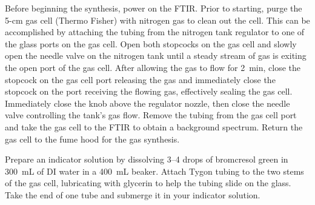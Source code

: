 Before beginning the synthesis, power on the FTIR. 
Prior to starting, purge the 5-cm gas cell (Thermo Fisher) with nitrogen gas to clean out the cell.
This can be accomplished by attaching the tubing from the nitrogen tank regulator to one of the glass ports on the gas cell. 
Open both stopcocks on the gas cell and slowly open the needle valve on the nitrogen tank until a steady stream of gas is exiting the open port of the gas cell. 
After allowing the gas to flow for \SI{2}{\minute}, close the stopcock on the gas cell port releasing the gas and immediately close the stopcock on the port receiving the flowing gas, effectively sealing the gas cell. 
Immediately close the knob above the regulator nozzle, then close the needle valve controlling the tank's gas flow. 
Remove the tubing from the gas cell port and take the gas cell to the FTIR to obtain a background spectrum. 
Return the gas cell to the fume hood for the gas synthesis. 

Prepare an indicator solution by dissolving \numrange{3}{4} drops of bromcresol green in \SI{300}{\mL} of DI water in a \SI{400}{\mL} beaker. 
Attach Tygon tubing to the two stems of the gas cell, lubricating with glycerin to help the tubing slide on the glass. 
Take the end of one tube and submerge it in your indicator solution. 

